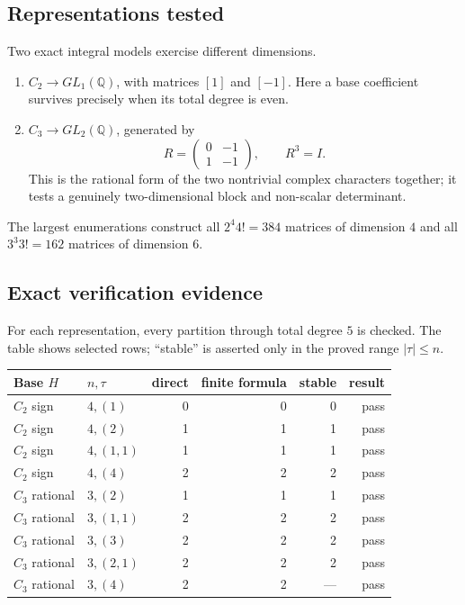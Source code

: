 \documentclass[10pt]{article}
\begin{document}
\subsection{Representations tested}
Two exact integral models exercise different dimensions.
\begin{enumerate}
\item $C_2\to GL_1(\mathbb Q)$, with matrices $[1]$ and $[-1]$.  Here a base
coefficient survives precisely when its total degree is even.
\item $C_3\to GL_2(\mathbb Q)$, generated by
\[
 R=\begin{pmatrix}0&-1\\1&-1\end{pmatrix},\qquad R^3=I.
\]
This is the rational form of the two nontrivial complex characters together;
it tests a genuinely two-dimensional block and non-scalar determinant.
\end{enumerate}
The largest enumerations construct all $2^4 4!=384$ matrices of dimension
$4$ and all $3^3 3!=162$ matrices of dimension $6$.

\newpage
\subsection{Exact verification evidence}
For each representation, every partition through total degree $5$ is checked.
The table shows selected rows; ``stable'' is asserted only in the proved range
$|\tau|\le n$.
\begin{center}
\small
\begin{tabular}{@{}llrrrr@{}}
\toprule
Base $H$ & $n,\tau$ & direct & finite formula & stable & result\\
\midrule
$C_2$ sign & $4,(1)$ & 0 & 0 & 0 & pass\\
$C_2$ sign & $4,(2)$ & 1 & 1 & 1 & pass\\
$C_2$ sign & $4,(1,1)$ & 1 & 1 & 1 & pass\\
$C_2$ sign & $4,(4)$ & 2 & 2 & 2 & pass\\
$C_3$ rational & $3,(2)$ & 1 & 1 & 1 & pass\\
$C_3$ rational & $3,(1,1)$ & 2 & 2 & 2 & pass\\
$C_3$ rational & $3,(3)$ & 2 & 2 & 2 & pass\\
$C_3$ rational & $3,(2,1)$ & 2 & 2 & 2 & pass\\
$C_3$ rational & $3,(4)$ & 2 & 2 & --- & pass\\
\bottomrule
\end{tabular}
\end{center}
\end{document}
